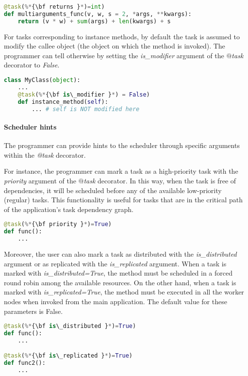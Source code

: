 \begin{lstlisting}[language=python]
@task(%*{\bf returns }*)=int)
def multiarguments_func(v, w, s = 2, *args, **kwargs):
    return (v * w) + sum(args) + len(kwargs) + s
\end{lstlisting}

For tasks corresponding to instance methods, by default the task is assumed to modify the callee object 
(the object on which the method is invoked). The programmer can tell otherwise by setting the 
{\it is\_modifier} argument of the {\it $@$task} decorator to {\it False}.

\begin{lstlisting}[language=python]
class MyClass(object):
    ...
    @task(%*{\bf is\_modifier }*) = False)
    def instance_method(self):
        ... # self is NOT modified here
\end{lstlisting}

\paragraph{Scheduler hints}

The programmer can provide hints to the scheduler through specific arguments within the {\it @task} decorator.

For instance, the programmer can mark a task as a high-priority task with the {\it priority} argument of the 
{\it $@$task} decorator. In this way, when the task is free of dependencies, it will be scheduled before 
any of the available low-priority (regular) tasks. This functionality is useful for tasks that are in 
the critical path of the application’s task dependency graph.

\begin{lstlisting}[language=python]
@task(%*{\bf priority }*)=True)
def func():
    ...
\end{lstlisting}

Moreover, the user can also mark a task as distributed with the {\it is\_distributed} argument or as 
replicated with the {\it is\_replicated} argument. When a task is marked with {\it is\_distributed=True}, 
the method must be scheduled in a forced round robin among the available resources.
On the other hand, when a task is marked with {\it is\_replicated=True}, the method must be executed in 
all the worker nodes when invoked from the main application.
The default value for these parameters is False.

\begin{lstlisting}[language=python]
@task(%*{\bf is\_distributed }*)=True)
def func():
    ...

@task(%*{\bf is\_replicated }*)=True)
def func2():
    ...
\end{lstlisting}

